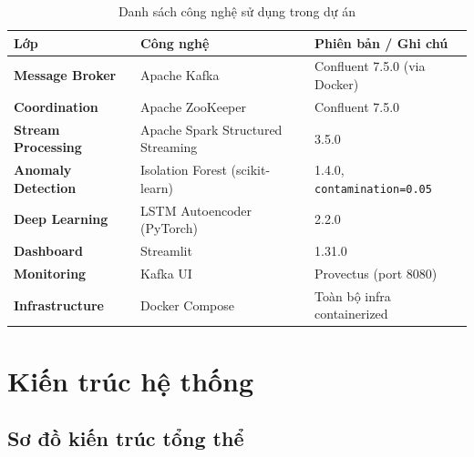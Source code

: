 \documentclass[12pt,a4paper]{article}
\begin{document}
\begin{table}[H]
\centering
\begin{tabularx}{\linewidth}{>{\bfseries}l l X}
\toprule
Lớp & Công nghệ & Phiên bản / Ghi chú \\
\midrule
Message Broker & Apache Kafka & Confluent 7.5.0 (via Docker) \\
Coordination & Apache ZooKeeper & Confluent 7.5.0 \\
Stream Processing & Apache Spark Structured Streaming & 3.5.0 \\
Anomaly Detection & Isolation Forest (scikit-learn) & 1.4.0, \texttt{contamination=0.05} \\
Deep Learning & LSTM Autoencoder (PyTorch) & 2.2.0 \\
Dashboard & Streamlit & 1.31.0 \\
Monitoring & Kafka UI & Provectus (port 8080) \\
Infrastructure & Docker Compose & Toàn bộ infra containerized \\
\bottomrule
\end{tabularx}
\caption{Danh sách công nghệ sử dụng trong dự án}
\end{table}

\section{Kiến trúc hệ thống}

\subsection{Sơ đồ kiến trúc tổng thể}
\end{document}
